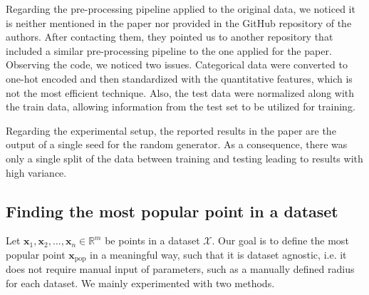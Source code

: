 Regarding the pre-processing pipeline applied to the original data, we noticed it is neither mentioned in the paper nor provided in the GitHub repository of the authors. After contacting them, they pointed us to another repository that included a similar pre-processing pipeline to the one applied for the paper. Observing the code, we noticed two issues. Categorical data were converted to one-hot encoded and then standardized with the quantitative features, which is not the most efficient technique. Also, the test data were normalized along with the train data, allowing information from the test set to be utilized for training.

Regarding the experimental setup, the reported results in the paper are the output of a single seed for the random generator. As a consequence, there was only a single split of the data between training and testing leading to results with high variance.

\subsection{Finding the most popular point in a dataset}
\label{app:nraa}
Let $\mathbf{x}_1, \mathbf{x}_2, \dots, \mathbf{x}_n \in \mathbb{R}^m$ be points in a dataset $\mathcal{X}$. Our goal is to define the most popular point $\mathbf{x}_{\mathrm{pop}}$ in a meaningful way, such that it is dataset agnostic, i.e. it does not require manual input of parameters, such as a manually defined radius for each dataset. We mainly experimented with two methods.

